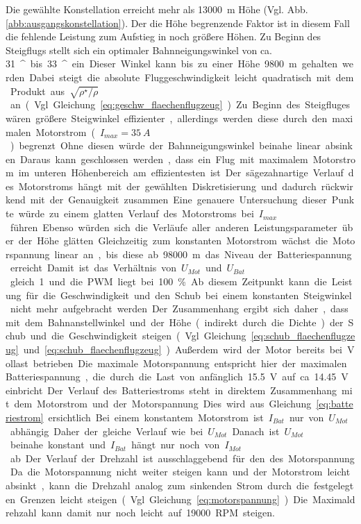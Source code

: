 Die gewählte Konstellation erreicht mehr als \SI{13000}{m} Höhe (Vgl. Abb. \ref{abb:ausgangskonstellation}). Der die Höhe begrenzende Faktor ist in diesem Fall die fehlende Leistung zum Aufstieg in noch größere Höhen. Zu Beginn des Steigflugs stellt sich ein optimaler Bahnneigungswinkel von ca. \SI{31}{^\circ} bis \SI{33}{^\star} ein. Dieser Winkel kann bis zu einer Höhe \SI{9800}{m} gehalten werden. Dabei steigt die absolute Fluggeschwindigkeit leicht quadratisch mit dem Produkt aus \ensuremath{\sqrt{\rho^\star/\rho}} an (Vgl. Gleichung \ref{eq:geschw_flaechenflugzeug}). Zu Beginn des Steigfluges wären größere Steigwinkel effizienter, allerdings werden diese durch den maximalen Motorstrom (\ensuremath{I_{max} = \SI{35}{A}}) begrenzt. Ohne diesen würde der Bahnneigungswinkel beinahe linear absinken. Daraus kann geschlossen werden, dass ein Flug mit maximalem Motorstrom im unteren Höhenbereich am effizientesten ist. Der sägezahnartige Verlauf des Motorstroms hängt mit der gewählten Diskretisierung und dadurch rückwirkend mit der Genauigkeit zusammen. Eine genauere Untersuchung dieser Punkte würde zu einem glatten Verlauf des Motorstroms bei \ensuremath{I_{max}} führen. Ebenso würden sich die Verläufe aller anderen Leistungsparameter über der Höhe glätten. Gleichzeitig zum konstanten Motorstrom wächst die Motorspannung linear an, bis diese ab \SI{98000}{m} das Niveau der Batteriespannung erreicht. Damit ist das Verhältnis von \ensuremath{U_{Mot}} und \ensuremath{U_{Bat}} gleich 1 und  die PWM liegt bei \SI{100}{\%}. Ab diesem Zeitpunkt kann die Leistung für die Geschwindigkeit und den Schub bei einem konstanten Steigwinkel nicht mehr aufgebracht werden. Der Zusammenhang ergibt sich daher, dass mit dem Bahnanstellwinkel und der Höhe (indirekt durch die Dichte) der Schub und die Geschwindigkeit steigen (Vgl. Gleichung \ref{eq:schub_flaechenflugzeug} und \ref{eq:schub_flaechenflugzeug}). Außerdem wird der Motor bereits bei Vollast betrieben. Die maximale Motorspannung entspricht hier der maximalen Batteriespannung, die durch die Last von anfänglich \SI{15,5}{V} auf ca. \SI{14.45}{V} einbricht. Der Verlauf des Batteriestroms steht in direktem Zusammenhang mit dem Motorstrom und der Motorspannung. Dies wird aus Gleichung \ref{eq:batteriestrom} ersichtlich. Bei einem konstantem Motorstrom ist  \ensuremath{I_{Bat}} nur von \ensuremath{U_{Mot}} abhängig. Daher der gleiche Verlauf wie bei \ensuremath{U_{Mot}}. Danach ist \ensuremath{U_{Mot}} beinahe konstant und \ensuremath{I_{Bat}} hängt nur noch von \ensuremath{I_{Mot}} ab. Der Verlauf der Drehzahl ist ausschlaggebend für den des Motorspannung. Da die Motorspannung nicht weiter steigen kann und der Motorstrom leicht absinkt, kann die Drehzahl analog zum sinkenden Strom durch die festgelegten Grenzen leicht steigen (Vgl. Gleichung \ref{eq:motorspannung}). Die Maximaldrehzahl kann damit nur noch leicht auf \SI{19000}{RPM} steigen. 
